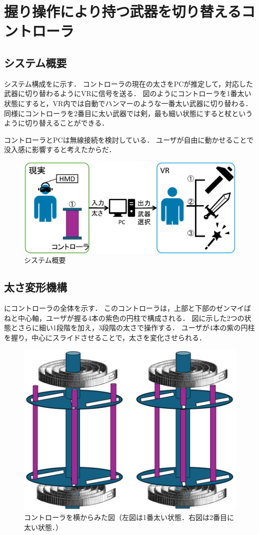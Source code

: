 \documentclass[uplatex]{jsarticle}
\begin{document}
\section{握り操作により持つ武器を切り替えるコントローラ}

\subsection{システム概要}

システム構成をに示す．
コントローラの現在の太さをPCが推定して，対応した武器に切り替わるようにVRに信号を送る．
図のようにコントローラを1番太い状態にすると，VR内では自動でハンマーのような一番太い武器に切り替わる．
同様にコントローラを2番目に太い武器では剣，最も細い状態にすると杖というように切り替えることができる．

コントローラとPCは無線接続を検討している．
ユーザが自由に動かせることで没入感に影響すると考えたからだ．

\begin{figure}
    \centering
    \includegraphics[width=0.9\linewidth]{fig/構成図.png}
    \caption{システム概要}
    \label{fig:system}
\end{figure}


\subsection{太さ変形機構}

にコントローラの全体を示す．
このコントローラは，上部と下部のゼンマイばねと中心軸，ユーザが握る4本の紫色の円柱で構成される．
図に示した2つの状態とさらに細い1段階を加え，3段階の太さで操作する．
ユーザが4本の紫の円柱を握り，中心にスライドさせることで，太さを変化させられる．

\begin{figure}[htbp]
    \centering
    \includegraphics[width=0.7\linewidth]{fig/横からみた図.png}
    \caption{コントローラを横からみた図（左図は1番太い状態．右図は2番目に太い状態．）}
    \label{fig:Zentai}
\end{figure}
\end{document}
